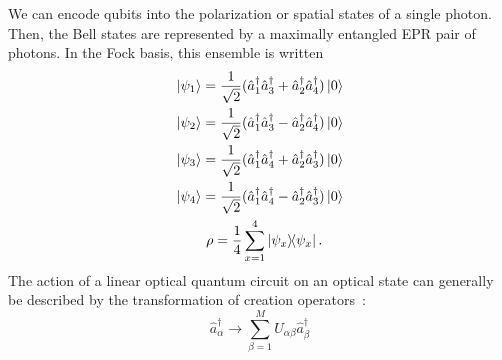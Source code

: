 \documentclass[aps,pra,twocolumn,showpacs,superscriptaddress,floatfix,10pt]{revtex4}
\begin{document}
We can encode qubits into the polarization or spatial states of a single photon. Then, the Bell states are represented by a maximally entangled EPR pair of photons. In the Fock basis, this ensemble is written
\begin{eqnarray}
\label{Bell States Creation Operator 1}
\ket{\psi_1} = \frac{1}{\sqrt{2}} (\hat{a}_1^\dagger \hat{a}_3^\dagger + \hat{a}_2^\dagger \hat{a}_4^\dagger) \ket{0} \\
\label{Bell States Creation Operator 2}
\ket{\psi_2} = \frac{1}{\sqrt{2}} (\hat{a}_1^\dagger \hat{a}_3^\dagger - \hat{a}_2^\dagger \hat{a}_4^\dagger) \ket{0} \\
\label{Bell States Creation Operator 3}
\ket{\psi_3} = \frac{1}{\sqrt{2}} (\hat{a}_1^\dagger \hat{a}_4^\dagger + \hat{a}_2^\dagger \hat{a}_3^\dagger) \ket{0} \\
\label{Bell States Creation Operator 4}
\ket{\psi_4} = \frac{1}{\sqrt{2}} (\hat{a}_1^\dagger \hat{a}_4^\dagger - \hat{a}_2^\dagger \hat{a}_3^\dagger) \ket{0} \\
\label{Bell State Ensemble}
\rho = \frac{1}{4} \sum_{x=1}^{4} \outerproduct{\psi_x}{\psi_x}. \quad  \enspace
\end{eqnarray}
The action of a linear optical quantum circuit on an optical state can generally be described by the transformation of creation operators~\cite{Reck}:
\begin{equation}
\label{LO Creation Operator Transformation}
\hat{a}^\dagger_\alpha \rightarrow \sum_{\beta=1}^{M} U_{\alpha\beta} \hat{a}^\dagger_\beta
\end{equation}
\end{document}
